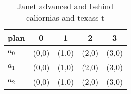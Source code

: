 \documentclass[a4paper]{article}
\begin{document}
\begin{table}
\begin{adjustbox}{width=0.5\columnwidth}
\begin{tabular}{|l|l|l|l|l|}
\hline
\textbf{plan} & \multicolumn{1}{c|}{\textbf{0}} & \multicolumn{1}{c|}{\textbf{1}} & \multicolumn{1}{c|}{\textbf{2}} & \multicolumn{1}{c|}{\textbf{3}} \\ \hline
\textbf{$a_0$}  & (0,0) & (1,0) & (2,0) & (3,0) \\ \hline
\textbf{$a_1$}  & (0,0) & (1,0) & (2,0) & (3,0) \\ \hline
\textbf{$a_2$}  & (0,0) & (1,0) & (2,0) & (3,0) \\ \hline
\end{tabular}
\end{adjustbox}
\caption{Janet advanced and behind caliornias and texass t
}
\end{table}
\end{document}
